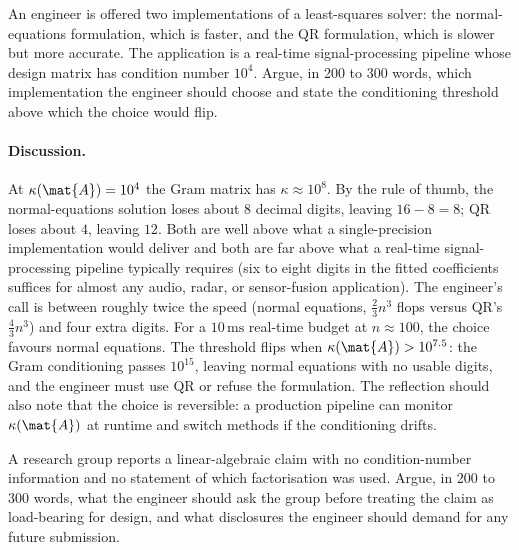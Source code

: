 \begin{exercise}
An engineer is offered two implementations of a least-squares
solver: the normal-equations formulation, which is faster, and
the QR formulation, which is slower but more accurate. The
application is a real-time signal-processing pipeline whose
design matrix has condition number $10^{4}$. Argue, in 200 to
300 words, which implementation the engineer should choose and
state the conditioning threshold above which the choice would
flip.
\end{exercise}

\paragraph{Discussion.}
At $\kappa(\mat{A}) = 10^{4}$ the Gram matrix has $\kappa \approx
10^{8}$. By the rule of thumb, the normal-equations solution loses
about $8$ decimal digits, leaving $16 - 8 = 8$; QR loses about
$4$, leaving $12$. Both are well above what a single-precision
implementation would deliver and both are far above what a real-time
signal-processing pipeline typically requires (six to eight digits
in the fitted coefficients suffices for almost any audio, radar,
or sensor-fusion application). The engineer's call is between
roughly twice the speed (normal equations, $\tfrac{2}{3}n^{3}$
flops versus QR's $\tfrac{4}{3}n^{3}$) and four extra digits.
For a $10\,\si{\milli\second}$ real-time budget at $n \approx 100$,
the choice favours normal equations. The threshold flips when
$\kappa(\mat{A}) > 10^{7.5}$: the Gram conditioning passes
$10^{15}$, leaving normal equations with no usable digits, and
the engineer must use QR or refuse the formulation. The reflection
should also note that the choice is reversible: a production
pipeline can monitor $\kappa(\mat{A})$ at runtime and switch
methods if the conditioning drifts.

\begin{exercise}
A research group reports a linear-algebraic claim with no
condition-number information and no statement of which
factorisation was used. Argue, in 200 to 300 words, what the
engineer should ask the group before treating the claim as
load-bearing for design, and what disclosures the engineer should
demand for any future submission.
\end{exercise}

